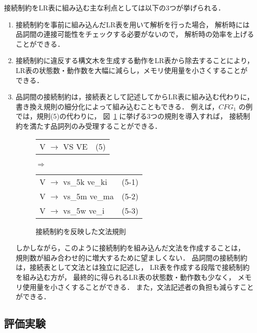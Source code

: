接続制約をLR表に組み込む主な利点としては以下の3つが挙げられる．
\begin{enumerate}
\item
  接続制約を事前に組み込んだLR表を用いて解析を行った場合，
  解析時には品詞間の連接可能性をチェックする必要がないので，
  解析時の効率を上げることができる．
\item 
  接続制約に違反する構文木を生成する動作をLR表から除去することにより，
  LR表の状態数・動作数を大幅に減らし，メモリ使用量を小さくすることができる．
\item 
  品詞間の接続制約は，接続表として記述してからLR表に組み込む代わりに，
  書き換え規則の細分化によって組み込むこともできる．
  例えば，$CFG_1$ の例では，規則(5)の代わりに，
  図~\ref{fig:rules} に挙げる3つの規則を導入すれば，
  接続制約を満たす品詞列のみ受理することができる．
  \begin{figure}[tbp]
    \begin{center}

      \begin{tabular}[c]{lc}
        V $\rightarrow$ VS VE & (5)\\
      \end{tabular}
      \hspace*{5mm}
      $\Rightarrow$
      \hspace*{5mm}
      \begin{tabular}[c]{lc}
        V $\rightarrow$ vs\_5k ve\_ki & (5-1)\\[-1mm]
        V $\rightarrow$ vs\_5m ve\_ma & (5-2)\\[-1mm]
        V $\rightarrow$ vs\_5w ve\_i  & (5-3)\\[-1mm]
      \end{tabular}
    
      \medskip

      \caption{接続制約を反映した文法規則}
      \label{fig:rules}
    \end{center}
  \end{figure}
  しかしながら，このように接続制約を組み込んだ文法を作成することは，
  規則数が組み合わせ的に増大するために望ましくない．
  品詞間の接続制約は，接続表として文法とは独立に記述し，
  LR表を作成する段階で接続制約を組み込む方が，
  最終的に得られるLR表の状態数・動作数も少なく，
  メモリ使用量を小さくすることができる．
  また，文法記述者の負担も減らすことができる．
\end{enumerate}


\subsection{評価実験}
\label{sec:tblgen exam}

